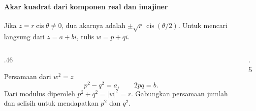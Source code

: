 \documentclass{../../kalkulus-ppt}
\DeclareMathOperator{\cis}{cis}
\begin{document}
\begin{frame}
    \frametitle{\insertsection}
    \framesubtitle{Akar kuadrat dari komponen real dan imajiner}
    Jika $z=r\cis\theta\ne0$, dua akarnya adalah $\pm\sqrt r\,\cis(\theta/2)$.
    Untuk mencari langsung dari $z=a+bi$, tulis $w=p+qi$.
    \begin{columns}[c,onlytextwidth]
        \begin{column}{.46\textwidth}
            \begin{block}{Persamaan dari $w^2=z$}
                \[
                    p^2-q^2=a,\qquad 2pq=b.
                \]
                Dari modulus diperoleh $p^2+q^2=|w|^2=r$.
                Gabungkan persamaan jumlah dan selisih untuk mendapatkan $p^2$ dan $q^2$.
            \end{block}
        \end{column}
        \begin{column}{.5\textwidth}
        \end{column}
    \end{columns}
    \par\smallskip
\end{frame}
\end{document}
